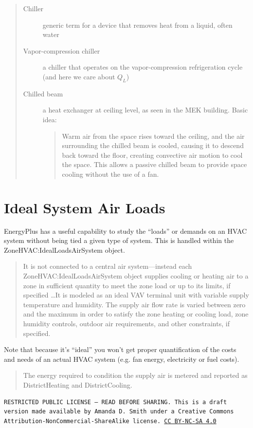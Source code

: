 \documentclass[10pt]{article}
\begin{document}
\begin{quote}
\begin{description}
\item[Chiller] generic term for a device that removes heat from a liquid, often water
\item[Vapor-compression chiller] a chiller that operates on the vapor-compression refrigeration cycle (and here we care about $Q_L$)
\item[Chilled beam]  a heat exchanger at ceiling level, as seen in the MEK building. Basic idea: 
\begin{quote}
    Warm air from the
space rises toward the ceiling, and the
air surrounding the chilled beam is
cooled, causing it to descend back
toward the floor, creating convective air
motion to cool the space. This allows a
passive chilled beam to provide space
cooling without the use of a fan. \cite{Murphy2009-un}
\end{quote}


\end{description}
\end{quote}



\section{Ideal System Air Loads}

EnergyPlus has a useful capability to study the ``loads'' or demands on an HVAC system without being tied a given type of system. This is handled within the ZoneHVAC:IdealLoadsAirSystem object.

\begin{quote}
    It is not connected
to a central air system---instead each ZoneHVAC:IdealLoadsAirSystem object supplies cooling or
heating air to a zone in sufficient quantity to meet the zone load or up to its limits, if specified \ldots It is modeled as an ideal VAV terminal unit with variable
supply temperature and humidity. The supply air flow rate is varied between zero and the maximum
in order to satisfy the zone heating or cooling load, zone humidity controls, outdoor air requirements,
and other constraints, if specified.
\cite{EPdocs9engineering}
\end{quote}

Note that because it's ``ideal'' you won't get proper quantification of the costs and needs of an actual HVAC system (e.g. fan energy, electricity or fuel costs).

\begin{quote}
The energy required to condition the supply air is metered and reported as DistrictHeating and DistrictCooling. \cite{EPdocs9inputoutput}
\end{quote}

\bigskip

\noindent
\texttt{\footnotesize RESTRICTED PUBLIC LICENSE --- READ BEFORE SHARING. This is a draft version made available by Amanda D. Smith under a Creative Commons Attribution-NonCommercial-ShareAlike license. 
\href{https://creativecommons.org/licenses/by-nc-sa/4.0/}{CC BY-NC-SA 4.0}}


\printbibliography
\end{document}
